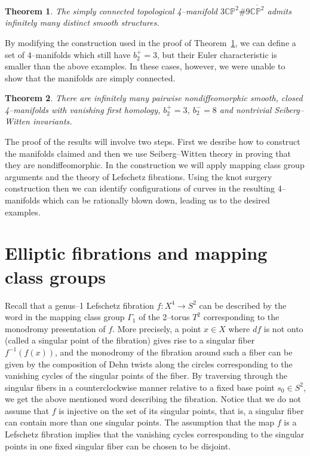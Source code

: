 \documentclass[11pt]{gtart}
\newtheorem{thm}{Theorem}[section]
\theoremstyle{definition}
\numberwithin{equation}{section}
\newcommand{\cpkk}{{\overline {{\mathbb C}{\mathbb P}^2}}}
\newcommand{\cpk}{{\mathbb {CP}}^2}
\begin{document}
\begin{thm} \label{t:m1}
The simply connected topological 4--manifold $3\cpk \# 9 \cpkk$ admits 
infinitely many distinct smooth structures.
\end{thm}

By modifying the construction used in the proof of Theorem~\ref{t:m1},
we can define a set of 4--manifolds which still have $b_2^+=3$, but
their Euler characteristic is smaller than the above examples. In
these cases, however, we were unable to show that the manifolds are
simply connected.

\begin{thm} \label{t:m2}
There are infinitely many pairwise nondiffeomorphic smooth, closed
4--manifolds with vanishing first homology, $b_2^+=3$, $b_2^-=8$
and nontrivial Seiberg--Witten invariants.
\end{thm}

The proof of the results will involve two steps. First we desribe how
to construct the manifolds claimed and then we use Seiberg--Witten
theory in proving that they are nondiffeomorphic. In the construction
we will apply mapping class group arguments and the theory of
Lefschetz fibrations.  Using the knot surgery construction then we can
identify configurations of curves in the resulting 4--manifolds which
can be rationally blown down, leading us to the desired examples.

\section{Elliptic fibrations and mapping class groups}

Recall that a genus--1 Lefschetz fibration $f\colon X^4\to S^2$ can be
described by the word in the mapping class group $\Gamma _1$ of the
2--torus $T^2$ corresponding to the monodromy presentation of
$f$. More precisely, a point $x\in X$ where $df$ is not onto (called a
singular point of the fibration) gives rise to a singular fiber
$f^{-1}(f(x))$, and the monodromy of the fibration around such a fiber
can be given by the composition of Dehn twists along the circles
corresponding to the vanishing cycles of the singular points of the
fiber. By traversing through the singular fibers in a counterclockwise
manner relative to a fixed base point $s_0\in S^2$, we get the above
mentioned word describing the fibration.  Notice that we do not assume
that $f$ is injective on the set of its singular points, that is, a
singular fiber can contain more than one singular points.  The
assumption that the map $f$ is a Lefschetz fibration implies that the
vanishing cycles corresponding to the singular points in one fixed
singular fiber can be chosen to be disjoint.
\end{document}
